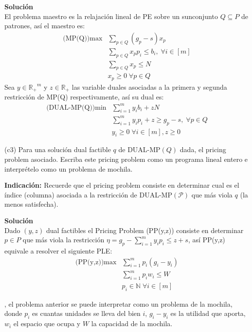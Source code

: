 \documentclass{article}
\theoremstyle{plain}
\theoremstyle{definition}
\theoremstyle{Azul}
\begin{document}
\begin{enumerate}[(a)]
\textbf{Solución}\\
El problema maestro es la relajación lineal de PE sobre un sunconjunto $Q\subseteq P$ de patrones, así el maestro es:
\begin{align*}
    \text{(MP(Q))} \max & \sum_{p\in Q} (g_{p}-s)x_{p}\\
    & \sum_{p\in Q}x_{p}p_{i}\leq b_{i}, \; \forall i\in[m]\\
    & \sum_{p\in Q}x_{p}\leq N\\
    & x_p\geq 0 \;\forall p \in Q
\end{align*}
Sea $y\in \mathbb{R_{+}}^{m}$ y $z\in\mathbb{R_{+}}$ las variable duales asociadas a la primera y segunda restricción de MP(Q) respectivamente, así su dual es:
\begin{align*}
    \text{(DUAL-MP(Q))} \min & \sum_{i=1}^{m}y_{i}b_{i}+zN\\
    & \sum_{i=1}^{m}y_{i}p_{i}+z\geq g_{p}-s, \; \forall p \in Q\\
 	& y_{i}\geq 0 \;\forall i \in [m], z\geq0
\end{align*}

(c3) Para una solución dual factible $q$ de DUAL-MP$(Q)$ dada, el pricing problem asociado. Escriba este pricing problem como un programa lineal entero e interprételo como un problema de mochila.

\textbf{Indicación:} Recuerde que el pricing problem consiste en determinar cual es el índice (columna) asociada a la restricción de DUAL-MP$(\mathcal{P})$ que más viola $q$ (la menos satisfecha).

\textbf{Solución}\\
Dado $(y,z)$ dual factibles el Pricing Problem (PP(y,z)) consiste en determinar $p\in P$ que más viola la restricción $\eta = g_{p}-\sum_{i=1}^{m}y_{i}p_{i}\leq z+s$, así PP(y,z) equivale a resolver el siguiente PLE:
\begin{align*}
	\text{(PP(y,z))} \max &\sum_{i=1}^{m}p_{i}(g_{i}-y_{i})\\
    &\sum_{i=1}^{m}p_{i}w_{i}\leq W\\
 	&p_{i}\in \mathbb{N} \; \forall i \in [m]
\end{align*}

, el problema anterior se puede interpretar como un problema de la mochila, donde  $p_{i}$ es cuantas unidades se lleva del bien $i$, $g_{i}-y_{i}$ es la utilidad que aporta, $w_{i}$ el espacio que ocupa y $W$ la capacidad de la mochila.

\end{enumerate}
\end{document}
